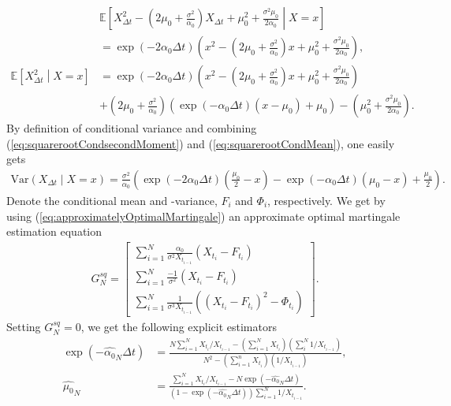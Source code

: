 \begin{align}
    &\mathbb{E}\left[X_{\Delta t}^2 - \left(2\mu_0 + \frac{\sigma^2}{\alpha_0}\right)X_{\Delta t} + \mu_0^2 + \frac{\sigma^2\mu_0}{2\alpha_0} \middle| X = x \right] \nonumber \\
    &= \exp\left(-2\alpha_0 \Delta t\right)\left(x^2 - \left(2\mu_0 + \frac{\sigma^2}{\alpha_0}\right)x + \mu_0^2 + \frac{\sigma^2 \mu_0}{2\alpha_0}\right),\\
    \mathbb{E}\left[X_{\Delta t}^2 \middle| X = x\right] &= \exp\left(-2\alpha_0 \Delta t\right)\left(x^2 - \left(2\mu_0 + \frac{\sigma^2}{\alpha_0}\right)x + \mu_0^2 + \frac{\sigma^2 \mu_0}{2\alpha_0}\right)  \nonumber  \\
     &+ \left(2\mu_0 + \frac{\sigma^2}{\alpha_0}\right) \left(\exp\left(-\alpha_0\Delta t \right)\left(x-\mu_0\right) + \mu_0\right) - \left(\mu_0^2 + \frac{\sigma^2\mu_0}{2\alpha_0}\right). \label{eq:squarerootCondsecondMoment}
\end{align}
By definition of conditional variance and combining (\ref{eq:squarerootCondsecondMoment}) and (\ref{eq:squarerootCondMean}), one easily gets
\begin{align}
    \mathrm{Var}\left(X_{\Delta t} \middle| X = x \right) = \frac{\sigma^2}{\alpha_0}\left(\exp\left(-2\alpha_0\Delta t \right)\left(\frac{\mu_0}{2} - x   \right) - \exp\left(-\alpha_0\Delta t\right)\left(\mu_0 - x\right) + \frac{\mu_0}{2}\right). \label{eq:squarerootCondVariance}
\end{align}
Denote the conditional mean and -variance, $F_i$ and $\Phi_i$, respectively. We get by using (\ref{eq:approximatelyOptimalMartingale}) an approximate optimal martingale estimation equation
\begin{align}
        G_N^{sq} = \begin{bmatrix}
            \sum_{i = 1}^N \frac{\alpha_0}{\sigma^2 X_{t_{i-1}}}\left(X_{t_i} - F_{t_i}\right)\\
            \sum_{i = 1}^N \frac{-1}{\sigma^2}\left(X_{t_i} - F_{t_i}\right)\\
            \sum_{i = 1}^N \frac{1}{\sigma^3 X_{t_{i-1}}}\left(\left(X_{t_i} - F_{t_i}\right)^2 - \Phi_{t_i}\right) \label{eq:squarerootMartingaleEquation}
        \end{bmatrix}.
\end{align}
Setting $G_N^{sq} = 0$, we get the following explicit estimators
\begin{align}
    \exp\left(-\hat{\alpha_0}_N\Delta t\right) &= \frac{N\sum_{i=1}^{N}X_{t_i} / X_{t_{i - 1}} - \left(\sum_{i = 1}^{N}X_{t_i}\right)\left(\sum_{i}^{N}1/X_{t_{i - 1}}\right)}{N^2 - \left(\sum_{i = 1}^{n}X_{t_i}\right)\left(1/X_{t_{i - 1}}\right)},\\
    \hat{\mu_0}_N &= \frac{\sum_{i = 1}^{N}X_{t_i} / X_{t_{i - 1}} - N \exp\left(-\hat{\alpha_0}_N\Delta t\right)}{\left(1-\exp\left(-\hat{\alpha_0}_N\Delta t\right)\right)\sum_{i = 1}^{N}1/X_{t_{i - 1}}}.
\end{align}
